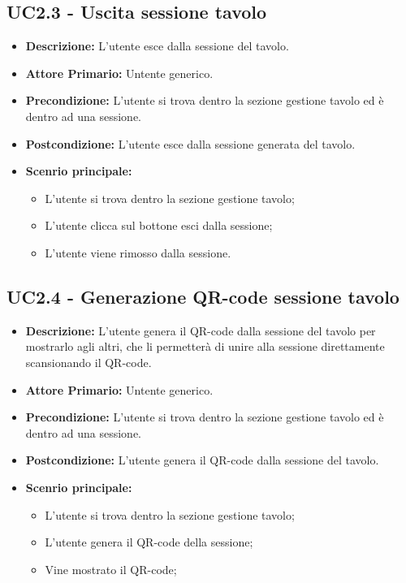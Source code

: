 \subsection{UC2.3 - Uscita sessione tavolo}
\begin{itemize}
    \item \textbf{Descrizione:} L'utente esce dalla sessione del tavolo.
    \item \textbf{Attore Primario:} Untente generico.
    \item \textbf{Precondizione:} L'utente si trova dentro la sezione gestione tavolo ed è dentro ad una sessione.
    \item \textbf{Postcondizione:} L'utente esce dalla sessione generata del tavolo.
    \item \textbf{Scenrio principale:}
    \begin{itemize}
        \item L'utente si trova dentro la sezione gestione tavolo;
        \item L'utente clicca sul bottone esci dalla sessione;
        \item L'utente viene rimosso dalla sessione.
    \end{itemize}
\end{itemize}
\subsection{UC2.4 - Generazione QR-code sessione tavolo}
\begin{itemize}
    \item \textbf{Descrizione:} L'utente genera il QR-code dalla sessione del tavolo per mostrarlo agli altri, che li permetterà di unire alla sessione direttamente scansionando il QR-code.
    \item \textbf{Attore Primario:} Untente generico.
    \item \textbf{Precondizione:} L'utente si trova dentro la sezione gestione tavolo ed è dentro ad una sessione.
    \item \textbf{Postcondizione:} L'utente genera il QR-code dalla sessione del tavolo.
    \item \textbf{Scenrio principale:}
    \begin{itemize}
        \item L'utente si trova dentro la sezione gestione tavolo;
        \item L'utente genera il QR-code della sessione;
        \item Vine mostrato il QR-code;
    \end{itemize}
\end{itemize}



